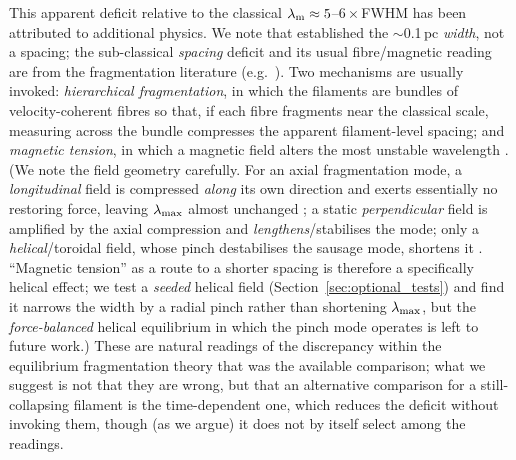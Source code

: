 \documentclass[usenatbib,twoside,twocolumn]{mnras}
\begin{document}
This apparent deficit relative to the classical $\lambda_{\rm m}\approx5$--$6\times$FWHM has been attributed to additional physics. We note that \citet{Arzoumanian2019} established the $\sim$0.1\,pc \emph{width}, not a spacing; the sub-classical \emph{spacing} deficit and its usual fibre/magnetic reading are from the fragmentation literature (e.g.\ \citealt{Fischera2012,Zhang2023cal}). Two mechanisms are usually invoked: \emph{hierarchical fragmentation}, in which the filaments are bundles of velocity-coherent fibres \citep{Hacar2013,Hacar2018,Yang2024} so that, if each fibre fragments near the classical scale, measuring across the bundle compresses the apparent filament-level spacing; and \emph{magnetic tension}, in which a magnetic field alters the most unstable wavelength \citep{Nakamura1993}. (We note the field geometry carefully. For an axial fragmentation mode, a \emph{longitudinal} field is compressed \emph{along} its own direction and exerts essentially no restoring force, leaving $\lambda_{\rm max}$ almost unchanged \citep[][consistent with our $\theta=0^\circ$ runs being nearly $\beta$-independent]{Nagasawa1987,Nakamura1993}; a static \emph{perpendicular} field is amplified by the axial compression and \emph{lengthens}/stabilises the mode; only a \emph{helical}/toroidal field, whose pinch destabilises the sausage mode, shortens it \citep{Fiege2000}. ``Magnetic tension'' as a route to a shorter spacing is therefore a specifically helical effect; we test a \emph{seeded} helical field (Section~\ref{sec:optional_tests}) and find it narrows the width by a radial pinch rather than shortening $\lambda_{\rm max}$, but the \emph{force-balanced} helical equilibrium in which the \citet{Fiege2000} pinch mode operates is left to future work.) These are natural readings of the discrepancy within the equilibrium fragmentation theory that was the available comparison; what we suggest is not that they are wrong, but that an alternative comparison for a still-collapsing filament is the time-dependent one, which reduces the deficit without invoking them, though (as we argue) it does not by itself select among the readings.
\end{document}
